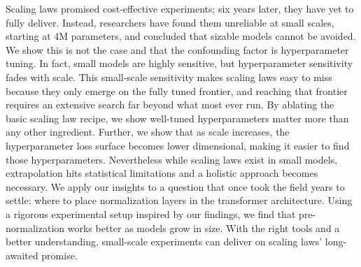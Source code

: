 Scaling laws promised cost-effective experiments; six years later, they have yet to fully deliver. Instead, researchers have found them unreliable at small scales, starting at 4M parameters, and concluded that sizable models cannot be avoided. We show this is not the case and that the confounding factor is hyperparameter tuning. In fact, small models are highly sensitive, but hyperparameter sensitivity fades with scale. This small-scale sensitivity makes scaling laws easy to miss because they only emerge on the fully tuned frontier, and reaching that frontier requires an extensive search far beyond what most ever run. By ablating the basic scaling law recipe, we show well-tuned hyperparameters matter more than any other ingredient. Further, we show that as scale increases, the hyperparameter loss surface becomes lower dimensional, making it easier to find those hyperparameters. Nevertheless while scaling laws exist in small models, extrapolation hits statistical limitations and a holistic approach becomes necessary. We apply our insights to a question that once took the field years to settle: where to place normalization layers in the transformer architecture. Using a rigorous experimental setup inspired by our findings, we find that pre-normalization works better as models grow in size. With the right tools and a better understanding, small-scale experiments can deliver on scaling laws' long-awaited promise.